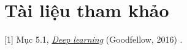 \section{Tài liệu tham khảo}
[1] Mục 5.1, \href{http://www.deeplearningbook.org/}{\textit{Deep learning}} (Goodfellow, 2016) \cite{Goodfellow-et-al-2016}.








